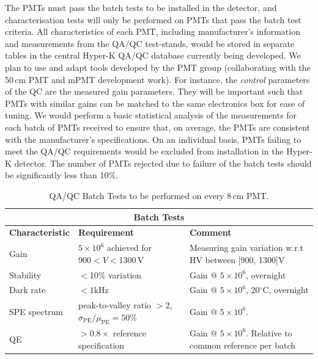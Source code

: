 \documentclass[12pt,a4paper]{article}
\begin{document}
The PMTs must pass the batch tests to be installed in the detector, and characterisation tests will only be performed on PMTs that pass the batch test criteria. All characteristics of each PMT, including manufacturer's information and measurements from the QA/QC test-stands, would be stored in separate tables in the central Hyper-K QA/QC database currently being developed. We plan to use and adapt tools developed by the PMT group (collaborating with the 50\,cm PMT and mPMT development work). For instance, the {\it{control}} parameters of the QC are the measured gain parameters. They will be important such that PMTs with similar gains can be matched to the same electronics box for ease of tuning. We would perform a basic statistical analysis of the measurements for each batch of PMTs received to ensure that, on average, the PMTs are consistent with the manufacturer's specifications. On an individual basis, PMTs failing to meet the QA/QC requirements would be excluded from installation in the Hyper-K detector.  The number of PMTs rejected due to failure of the batch tests should be significantly less than 10\%.

\begin{table}[!htb]
\begin{center}
\begin{tabular}{p{4cm}|p{4cm}|p{5cm}}
\hline
\multicolumn{3}{c}{{\bf Batch Tests}}\\\hline
{\bf Characteristic}  & {\bf Requirement}   & {\bf Comment }\\ \hline
Gain 	& $5 \times 10^6$ achieved for $900<V<$1300\,V 	& Measuring gain variation w.r.t HV between [900, 1300]V  \\ \hline
Stability 	& $<$10\% variation 	& Gain @ $5 \times 10^6$, overnight \\ \hline
Dark rate 	& $<1$kHz 	& Gain @ $5 \times 10^6$, 20$^\circ$C, overnight\\ \hline
SPE spectrum & peak-to-valley ratio $>2$, $\sigma_\text{PE} / \mu_\text{PE} = 50\%$ & Gain @ $5 \times 10^6$.\\ \hline
QE & $>0.8\times$ reference specification & Gain @ $5 \times 10^6$. Relative to common reference per batch \\ \hline
\end{tabular}
\caption{\label{tab:PMTbatchtests} QA/QC Batch Tests to be performed on every 8\,cm PMT.}
\end{center}
\label{tab-PMTQA_all}
\end{table}%
\end{document}
